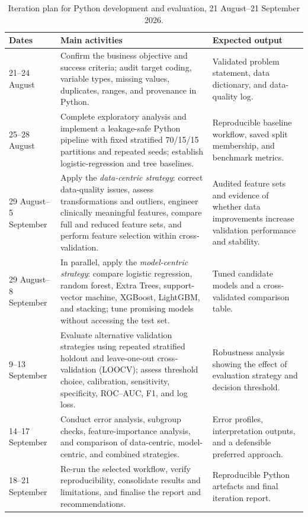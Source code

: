 \begin{table}[htbp]
\centering
\caption{Iteration plan for Python development and evaluation, 21 August--21 September 2026.}
\label{tab:iteration-plan}
\begin{tabularx}{\textwidth}{p{2.7cm} X X}
\toprule
\textbf{Dates} & \textbf{Main activities} & \textbf{Expected output} \\
\midrule
21--24 August & Confirm the business objective and success criteria; audit target coding, variable types, missing values, duplicates, ranges, and provenance in Python. & Validated problem statement, data dictionary, and data-quality log. \\
25--28 August & Complete exploratory analysis and implement a leakage-safe Python pipeline with fixed stratified 70/15/15 partitions and repeated seeds; establish logistic-regression and tree baselines. & Reproducible baseline workflow, saved split membership, and benchmark metrics. \\
29 August--5 September & Apply the \emph{data-centric strategy}: correct data-quality issues, assess transformations and outliers, engineer clinically meaningful features, compare full and reduced feature sets, and perform feature selection within cross-validation. & Audited feature sets and evidence of whether data improvements increase validation performance and stability. \\
29 August--8 September & In parallel, apply the \emph{model-centric strategy}: compare logistic regression, random forest, Extra Trees, support-vector machine, XGBoost, LightGBM, and stacking; tune promising models without accessing the test set. & Tuned candidate models and a cross-validated comparison table. \\
9--13 September & Evaluate alternative validation strategies using repeated stratified holdout and leave-one-out cross-validation (LOOCV); assess threshold choice, calibration, sensitivity, specificity, ROC--AUC, F1, and log loss. & Robustness analysis showing the effect of evaluation strategy and decision threshold. \\
14--17 September & Conduct error analysis, subgroup checks, feature-importance analysis, and comparison of data-centric, model-centric, and combined strategies. & Error profiles, interpretation outputs, and a defensible preferred approach. \\
18--21 September & Re-run the selected workflow, verify reproducibility, consolidate results and limitations, and finalise the report and recommendations. & Reproducible Python artefacts and final iteration report. \\
\bottomrule
\end{tabularx}
\end{table}

